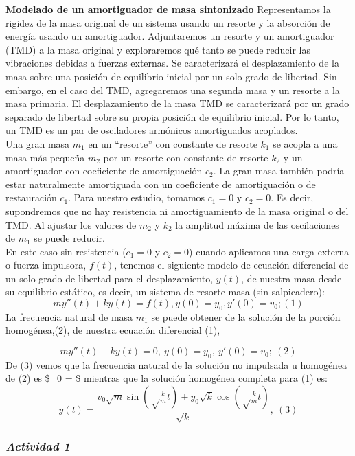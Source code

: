\documentclass[
]{article}
\begin{document}
\textbf{Modelado de un amortiguador de masa sintonizado} Representamos
la rigidez de la masa original de un sistema usando un resorte y la
absorción de energía usando un amortiguador. Adjuntaremos un resorte y
un amortiguador (TMD) a la masa original y exploraremos qué tanto se
puede reducir las vibraciones debidas a fuerzas externas. Se
caracterizará el desplazamiento de la masa sobre una posición de
equilibrio inicial por un solo grado de libertad. Sin embargo, en el
caso del TMD, agregaremos una segunda masa y un resorte a la masa
primaria. El desplazamiento de la masa TMD se caracterizará por un grado
separado de libertad sobre su propia posición de equilibrio inicial. Por
lo tanto, un TMD es un par de osciladores armónicos amortiguados
acoplados.\\
Una gran masa \(m_1\) en un ``resorte'' con constante de resorte \(k_1\)
se acopla a una masa más pequeña \(m_2\) por un resorte con constante de
resorte \(k_2\) y un amortiguador con coeficiente de amortiguación
\(c_2\). La gran masa también podría estar naturalmente amortiguada con
un coeficiente de amortiguación o de restauración \(c_1\). Para nuestro
estudio, tomamos \(c_1 = 0\) y \(c_2 = 0\). Es decir, supondremos que no
hay resistencia ni amortiguamiento de la masa original o del TMD. Al
ajustar los valores de \(m_2\) y \(k_2\) la amplitud máxima de las
oscilaciones de \(m_1\) se puede reducir.\\
En este caso sin resistencia (\(c_1 = 0\) y \(c_2 = 0\)) cuando
aplicamos una carga externa o fuerza impulsora, \(f(t)\), tenemos el
siguiente modelo de ecuación diferencial de un solo grado de libertad
para el desplazamiento, \(y(t)\), de nuestra masa desde su equilibrio
estático, es decir, un sistema de resorte-masa (sin salpicadero):
\[my''(t) + ky(t) = f(t), y(0)=y_0, y'(0) = v_0; (1)\] La frecuencia
natural de masa \(m_1\) se puede obtener de la solución de la porción
homogénea,(2), de nuestra ecuación diferencial (1),

\[my''(t) + ky(t) = 0, \ y(0)=y_0, \  y'(0) = v_0; \ (2)\] De (3) vemos
que la frecuencia natural de la solución no impulsada u homogénea de (2)
es \$\omega\_0 = \sqrt {} \$ mientras que la solución
homogénea completa para (1) es:
\[y(t)= \frac {v_0 \sqrt m \sin(\sqrt \frac {k}{m}t)+y_0 \sqrt k \cos(\sqrt \frac {k}{m} t)}{\sqrt k}, \ (3) \]

\hypertarget{actividad-1}{%
\subsubsection{\texorpdfstring{\emph{Actividad
1}}{Actividad 1}}\label{actividad-1}}
\end{document}
